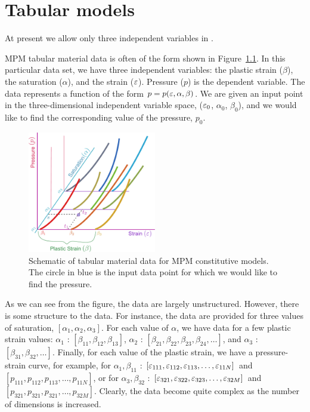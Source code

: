 \chapter{Tabular models} \label{ch:tabular}
\begin{NoteBox}
At present we allow only three independent variables in \Vaango.
\end{NoteBox}

MPM tabular material data is often of the form  shown in Figure~\ref{fig:tabular_data}.
In this particular data set, we have three independent variables: the plastic strain ($\beta$),
the saturation ($\alpha$), and the strain ($\varepsilon$).  Pressure ($p$) is the dependent variable.
The data represents a function of the form $p = p(\varepsilon, \alpha, \beta)$.  We are given 
an input point in the three-dimensional independent variable space, 
($\varepsilon_0$, $\alpha_0$, $\beta_0$), and we would like to find the corresponding value of
the pressure, $p_0$.
\begin{figure}[htbp!]
  \centering
  \includegraphics[width=0.5\textwidth]{Figs/tabular/table_interpolation.pdf}
  \caption{Schematic of tabular material data for MPM constitutive models. The circle
           in blue is the input data point for which we would like to find the pressure.}
  \label{fig:tabular_data}
\end{figure}

As we can see from the figure, the data are largely unstructured.  However, there is
some structure to the data.  For instance, the data are provided for three values of
saturation, $[\alpha_1, \alpha_2, \alpha_3]$.  For each value of $\alpha$, we have 
data for a few plastic strain values: $\alpha_1$ : $[\beta_{11}, \beta_{12}, \beta_{13}]$,
$\alpha_2$ : $[\beta_{21}, \beta_{22}, \beta_{23}, \beta_{24}, \dots]$, and
$\alpha_3$ : $[\beta_{31}, \beta_{32}, \dots]$.  Finally, for each value of the plastic
strain, we have a pressure-strain curve, for example, for
$\alpha_1, \beta_{11}$ : $[\varepsilon_{111}, \varepsilon_{112}, \varepsilon_{113}, \dots, \varepsilon_{11N}]$ and
$[p_{111}, p_{112}, p_{113}, \dots, p_{11N}]$, or for
$\alpha_3, \beta_{32}$ : $[\varepsilon_{321}, \varepsilon_{322}, \varepsilon_{323}, \dots, \varepsilon_{32M}]$ and
$[p_{321}, p_{321}, p_{321}, \dots, p_{32M}]$.  Clearly, the data become quite complex
as the number of dimensions is increased.  


